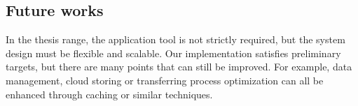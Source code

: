 \subsection{Future works}

In the thesis range, the application tool is not strictly required, but the system design must be flexible and scalable. Our implementation satisfies preliminary targets, but there are many points that can still be improved. For example, data management, cloud storing or  transferring process optimization can all be enhanced through caching or similar techniques.